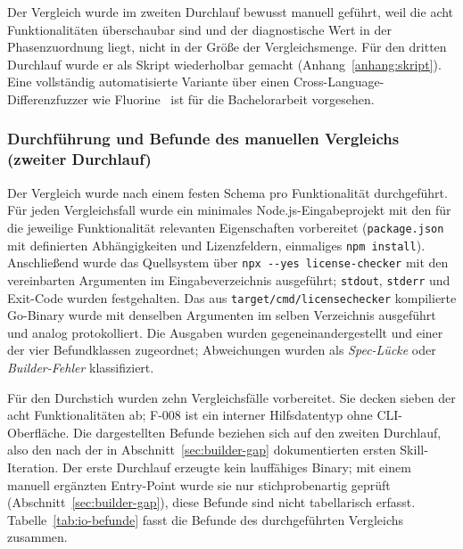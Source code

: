 Der Vergleich wurde im zweiten Durchlauf bewusst manuell geführt, weil die acht Funktionalitäten überschaubar sind und der diagnostische Wert in der Phasenzuordnung liegt, nicht in der Größe der Vergleichsmenge. Für den dritten Durchlauf wurde er als Skript wiederholbar gemacht (Anhang~\ref{anhang:skript}). Eine vollständig automatisierte Variante über einen Cross-Language-Differenzfuzzer wie Fluorine~\parencite{eniser2025realworld} ist für die Bachelorarbeit vorgesehen.

\subsubsection{Durchführung und Befunde des manuellen Vergleichs (zweiter Durchlauf)} \label{sec:io-befunde}

Der Vergleich wurde nach einem festen Schema pro Funktionalität durchgeführt. Für jeden Vergleichsfall wurde ein minimales Node.js-Eingabeprojekt mit den für die jeweilige Funktionalität relevanten Eigenschaften vorbereitet (\texttt{package.json} mit definierten Abhängigkeiten und Lizenzfeldern, einmaliges \texttt{npm install}). Anschließend wurde das Quellsystem über \texttt{npx -{}-yes license-checker} mit den vereinbarten Argumenten im Eingabeverzeichnis ausgeführt; \texttt{stdout}, \texttt{stderr} und Exit-Code wurden festgehalten. Das aus \texttt{target/cmd/licensechecker} kompilierte Go-Binary wurde mit denselben Argumenten im selben Verzeichnis ausgeführt und analog protokolliert. Die Ausgaben wurden gegeneinandergestellt und einer der vier Befundklassen zugeordnet; Abweichungen wurden als \emph{Spec-Lücke} oder \emph{Builder-Fehler} klassifiziert.

Für den Durchstich wurden zehn Vergleichsfälle vorbereitet. Sie decken sieben der acht Funktionalitäten ab; F-008 ist ein interner Hilfsdatentyp ohne CLI-Oberfläche. Die dargestellten Befunde beziehen sich auf den zweiten Durchlauf, also den nach der in Abschnitt~\ref{sec:builder-gap} dokumentierten ersten Skill-Iteration. Der erste Durchlauf erzeugte kein lauffähiges Binary; mit einem manuell ergänzten Entry-Point wurde sie nur stichprobenartig geprüft (Abschnitt~\ref{sec:builder-gap}), diese Befunde sind nicht tabellarisch erfasst. Tabelle~\ref{tab:io-befunde} fasst die Befunde des durchgeführten Vergleichs zusammen.

